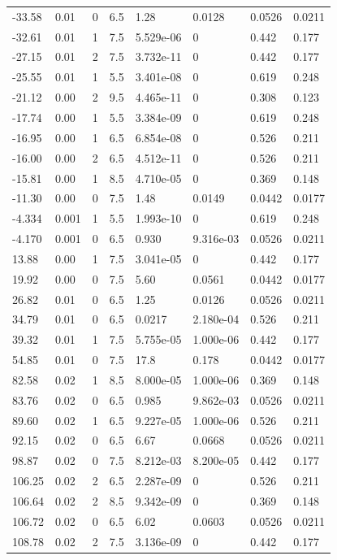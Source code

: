 \documentclass[preview]{standalone}
\begin{document}
{{\begin{tabular}{L{1.2cm}C{1.2cm} C{0.3cm}C{0.5cm} C{1.4cm}C{1.4cm} C{1.4cm}C{1.4cm}}
  -33.58  &  0.01  & 0     & 6.5 &  1.28  & 0.0128  & 0.0526 &  0.0211   \\ 
  -32.61  &  0.01  & 1     & 7.5 &  5.529e-06  & 0  & 0.442 &  0.177   \\ 
  -27.15  &  0.01  & 2     & 7.5 &  3.732e-11  & 0  & 0.442 &  0.177   \\ 
  -25.55  &  0.01  & 1     & 5.5 &  3.401e-08  & 0  & 0.619 &  0.248   \\ 
  -21.12  &  0.00  & 2     & 9.5 &  4.465e-11  & 0  & 0.308 &  0.123   \\ 
  -17.74  &  0.00  & 1     & 5.5 &  3.384e-09  & 0  & 0.619 &  0.248   \\ 
  -16.95  &  0.00  & 1     & 6.5 &  6.854e-08  & 0  & 0.526 &  0.211   \\ 
  -16.00  &  0.00  & 2     & 6.5 &  4.512e-11  & 0  & 0.526 &  0.211   \\ 
  -15.81  &  0.00  & 1     & 8.5 &  4.710e-05  & 0  & 0.369 &  0.148   \\ 
  -11.30  &  0.00  & 0     & 7.5 &  1.48  & 0.0149  & 0.0442 &  0.0177   \\ 
  -4.334  &  0.001  & 1     & 5.5 &  1.993e-10  & 0  & 0.619 &  0.248   \\ 
  -4.170  &  0.001  & 0     & 6.5 &  0.930  & 9.316e-03  & 0.0526 &  0.0211   \\ 
  13.88  &  0.00  & 1     & 7.5 &  3.041e-05  & 0  & 0.442 &  0.177   \\ 
  19.92  &  0.00  & 0     & 7.5 &  5.60  & 0.0561  & 0.0442 &  0.0177   \\ 
  26.82  &  0.01  & 0     & 6.5 &  1.25  & 0.0126  & 0.0526 &  0.0211   \\ 
  34.79  &  0.01  & 0     & 6.5 &  0.0217  & 2.180e-04  & 0.526 &  0.211   \\ 
  39.32  &  0.01  & 1     & 7.5 &  5.755e-05  & 1.000e-06  & 0.442 &  0.177   \\ 
  54.85  &  0.01  & 0     & 7.5 &  17.8  & 0.178  & 0.0442 &  0.0177   \\ 
  82.58  &  0.02  & 1     & 8.5 &  8.000e-05  & 1.000e-06  & 0.369 &  0.148   \\ 
  83.76  &  0.02  & 0     & 6.5 &  0.985  & 9.862e-03  & 0.0526 &  0.0211   \\ 
  89.60  &  0.02  & 1     & 6.5 &  9.227e-05  & 1.000e-06  & 0.526 &  0.211   \\ 
  92.15  &  0.02  & 0     & 6.5 &  6.67  & 0.0668  & 0.0526 &  0.0211   \\ 
  98.87  &  0.02  & 0     & 7.5 &  8.212e-03  & 8.200e-05  & 0.442 &  0.177   \\ 
  106.25  &  0.02  & 2     & 6.5 &  2.287e-09  & 0  & 0.526 &  0.211   \\ 
  106.64  &  0.02  & 2     & 8.5 &  9.342e-09  & 0  & 0.369 &  0.148   \\ 
  106.72  &  0.02  & 0     & 6.5 &  6.02  & 0.0603  & 0.0526 &  0.0211   \\ 
  108.78  &  0.02  & 2     & 7.5 &  3.136e-09  & 0  & 0.442 &  0.177   \\ 
\hline 
\end{tabular} 

}}
\end{document}
